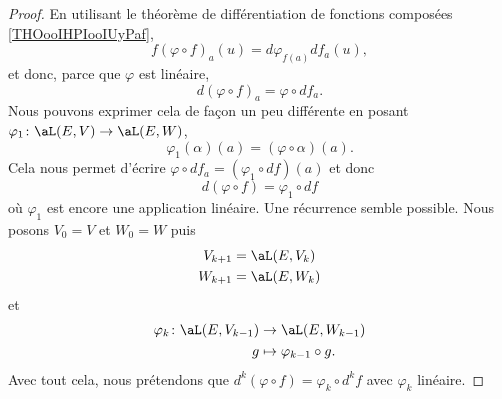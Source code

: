 \begin{proof}
    En utilisant le théorème de différentiation de fonctions composées \ref{THOooIHPIooIUyPaf},
    \begin{equation}
        f(\varphi\circ f)_a(u)=d\varphi_{f(a)}df_a(u),
    \end{equation}
    et donc, parce que \( \varphi\) est linéaire,
    \begin{equation}
        d(\varphi\circ f)_a=\varphi\circ df_a.
    \end{equation}
    Nous pouvons exprimer cela de façon un peu différente en posant \( \varphi_1\colon \aL(E,V)\to \aL(E,W)\),
    \begin{equation}
        \varphi_1(\alpha)(a)=(\varphi\circ \alpha)(a).
    \end{equation}
    Cela nous permet d'écrire \( \varphi\circ df_a=(\varphi_1\circ df)(a)\) et donc
    \begin{equation}        \label{EQooUJPWooTzgSJx}
        d(\varphi\circ f)=\varphi_1\circ df
    \end{equation}
    où \( \varphi_1\) est encore une application linéaire. Une récurrence semble possible. Nous posons \( V_0=V\) et \( W_0=W\) puis
    \begin{subequations}
        \begin{align}
            V_{k+1}&=\aL(E,V_k)\\
            W_{k+1}&=\aL(E,W_k)
        \end{align}
    \end{subequations}
    et
    \begin{equation}
        \begin{aligned}
            \varphi_k\colon \aL(E,V_{k-1})&\to \aL(E,W_{k-1}) \\
            g&\mapsto \varphi_{k-1}\circ g.
        \end{aligned}
    \end{equation}
    Avec tout cela, nous prétendons que \( d^k(\varphi\circ f)=\varphi_k\circ d^kf\) avec \( \varphi_k\) linéaire.


\end{proof}
